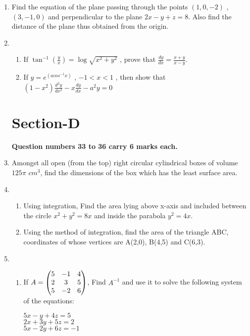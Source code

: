 \documentclass[journal,12pt,twocolumn]{IEEEtran}
\renewcommand\thesection{\arabic{section}}
\begin{document}
\begin{enumerate}[label=\thesection.\arabic*.,ref=\thesection.\theenumi]
\item Find the equation of the plane passing through the points $(1,0,-2)$ , $(3,-1,0)$ and perpendicular to the plane $ 2x-y+z=8 $. Also find the distance of the plane thus obtained from the origin.\\

\item \begin{enumerate} \item If $\tan^{-1}(\frac{y}{x})=\log \sqrt{x^2+y^2}$ , prove that $\frac{dy}{dx}=\frac{x+y}{x-y}$.  
    
\item If  $ y=e^{(acos^{-1}x)} $ , $-1 < x < 1$ , then show that  $(1-x^2) \frac{d^2y}{dx^2} - x \frac{dy}{dx} - a^2y =0 $\\
\end{enumerate}

 \section{Section-D}
 
 \textbf{Question numbers 33 to 36 carry 6 marks each.}\\
 
 \item Amongst all open (from the top) right circular cylindrical boxes of volume $125 \pi $ $cm^3$, find the dimensions of the box which has the least surface area.\\  
 
 \item \begin{enumerate} \item Using integration, Find the area lying above x-axis and included between the circle $ x^2 + y^2 =8x $ and inside the parabola $ y^2 =4x $.   
    
\item Using the method of integration, find the area of the triangle ABC, coordinates of whose vertices are A(2,0), B(4,5) and C(6,3).\\
 \end{enumerate}
\item \begin{enumerate} \item If $A=\begin{pmatrix}5 & -1 & 4 \\ 2 & 3 & 5 \\ 5 & -2 & 6\end{pmatrix} $, Find $A^{-1}$ and use it to solve the following system of the equations: \\
\begin{center}
        $5x-y+4z=5 $\\
        $2x+3y+5z=2 $\\
        $5x-2y+6z=-1 $
    \end{center}
    

\end{enumerate}
\end{enumerate}
\end{document}

